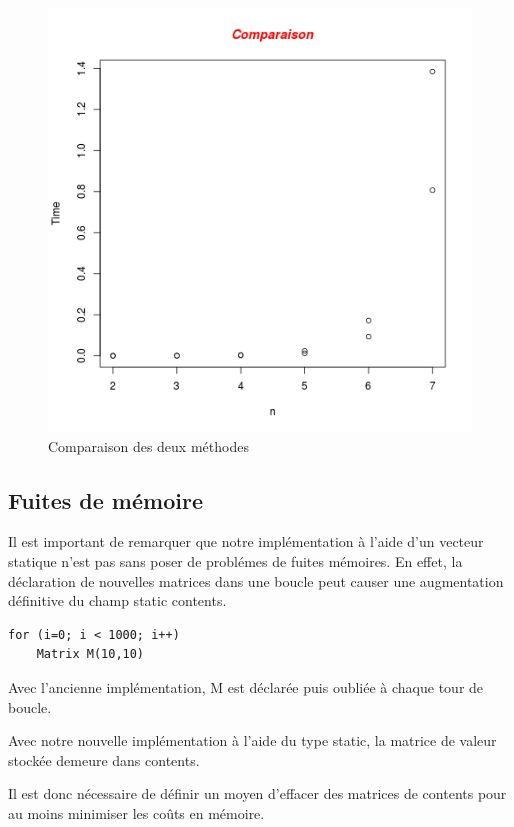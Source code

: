 \documentclass[a4paper,11pt]{article}
\begin{document}
\begin{figure}
  \centering
  \includegraphics[scale=0.5]{Comparison.png}
  \caption{Comparaison des deux méthodes}
  \label{fig:phd}
\end{figure}


\subsection{Fuites de mémoire}

Il est important de remarquer que notre implémentation à l'aide d'un vecteur statique n'est pas sans poser de problémes de fuites mémoires.
En effet, la déclaration de nouvelles matrices dans une boucle peut causer une augmentation définitive du champ static contents.

\begin{lstlisting}
for (i=0; i < 1000; i++)
    Matrix M(10,10)
\end{lstlisting}

Avec l'ancienne implémentation, M est déclarée puis oubliée à chaque tour de boucle.

Avec notre nouvelle implémentation à l'aide du type static, la matrice de valeur stockée demeure dans contents.

Il est donc nécessaire de définir un moyen d'effacer des matrices de contents pour au moins minimiser les coûts en mémoire.
\end{document}
